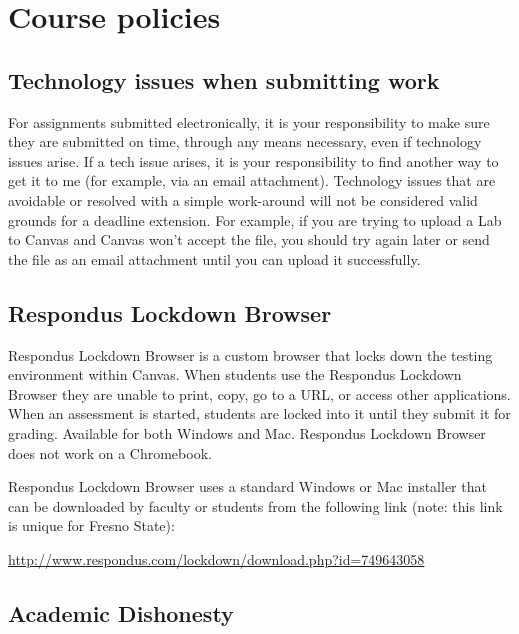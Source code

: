 \hypertarget{course-policies}{%
\section{Course policies}\label{course-policies}}

\hypertarget{technology-issues-when-submitting-work}{%
\subsection{Technology issues when submitting
work}\label{technology-issues-when-submitting-work}}

For assignments submitted electronically, it is your responsibility to
make sure they are submitted on time, through any means necessary, even
if technology issues arise. If a tech issue arises, it is your
responsibility to find another way to get it to me (for example, via an
email attachment). Technology issues that are avoidable or resolved with
a simple work-around will not be considered valid grounds for a deadline
extension. For example, if you are trying to upload a Lab to Canvas and
Canvas won't accept the file, you should try again later or send the
file as an email attachment until you can upload it successfully.

\hypertarget{respondus-lockdown-browser}{%
\subsection{Respondus Lockdown
Browser}\label{respondus-lockdown-browser}}

Respondus Lockdown Browser is a custom browser that locks down the
testing environment within Canvas. When students use the Respondus
Lockdown Browser they are unable to print, copy, go to a URL, or access
other applications. When an assessment is started, students are locked
into it until they submit it for grading. Available for both Windows and
Mac. Respondus Lockdown Browser does not work on a Chromebook.

Respondus Lockdown Browser uses a standard Windows or Mac installer that
can be downloaded by faculty or students from the following link (note:
this link is unique for Fresno State):

\url{http://www.respondus.com/lockdown/download.php?id=749643058}

\hypertarget{academic-dishonesty}{%
\subsection{Academic Dishonesty}\label{academic-dishonesty}}

